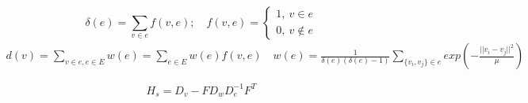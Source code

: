 \documentclass[12pt,a4paper,oneside,english]{report}
\begin{document}

  \[ \delta(e) = \sum_{v \in e} f(v,e);\quad  f(v,e) = \left\{
\begin{array}{ll}
      1,\ v \in e\\
      0,\  v \notin e
\end{array} 
\right. \]
\begin{eqnarray*}  d(v) = \sum_{v \in e, e \in E} w(e) = \sum_{e \in E} w(e)f(v,e) \quad w(e) = \frac{1}{\delta(e)(\delta(e)-1)} \sum_{\{v_i,v_j\} \in e} exp \left( -\frac{||v_i - v_j||^2}{\mu}\right)
\quad\end{eqnarray*}


  \[  H_s = D_v - FD_wD_e^{-1}F^T\]

\end{document}
